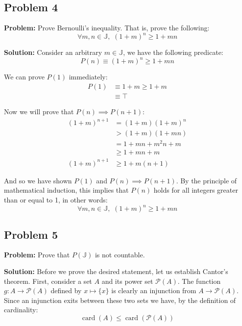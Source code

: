 \documentclass{article}
\newcommand{\posint}{\mathbb J}
\newcommand{\pset}[1]{\mathcal P(#1)}
\newcommand{\card}[1]{\operatorname{card}(#1)}
\begin{document}
\subsection*{Problem 4}
\noindent\textbf{Problem:} Prove Bernoulli's inequality. That is, prove the following:
\begin{equation*}
    \forall m,n\in\posint,\,\,(1+m)^n\ge1+mn
\end{equation*}

\noindent\textbf{Solution:} Consider an arbitrary $m\in\posint$, we have the following predicate:
$$P(n)\equiv(1+m)^n\ge1+mn$$

We can prove $P(1)$ immediately:
\begin{align*}
    P(1)&\equiv1+m\ge1+m\\
    &\equiv\top
\end{align*}

Now we will prove that $P(n)\implies P(n+1)$:
\begin{align*}
    (1+m)^{n+1}&=(1+m)(1+m)^n\tag{additive prop. of exponent}\\
    &>(1+m)(1+mn)\tag{assume the antecedent, $P(n)$}\\
    &=1+mn+m^2n+m\tag{algebra}\\
    &\ge1+mn+m\tag{$m,n\in\posint\implies m^2n>0$}\\
    (1+m)^{n+1}&\ge1+m(n+1)\tag{$P(n+1)$}
\end{align*}

And so we have shown $P(1)$ and $P(n)\implies P(n+1)$. By the principle of mathematical induction, this implies that $P(n)$ holds for all integers greater than or equal to 1, in other words:
$$\forall m,n\in\posint,\,\,(1+m)^n\ge1+mn$$


\subsection*{Problem 5}
\noindent\textbf{Problem:} Prove that $P(\posint)$ is not countable.
\bigskip

\noindent\textbf{Solution:} Before we prove the desired statement, let us establish Cantor's theorem. First, consider a set $A$ and its power set $\pset A$. The function $g:A\to\pset A$ defined by $x\mapsto\{x\}$ is clearly an injunction from $A\to\pset A$. Since an injunction exits between these two sets we have, by the definition of cardinality:
\begin{equation}
    \card A\le\card{\pset A}\tag{Lemma 1}
\end{equation}
\medskip
\end{document}
